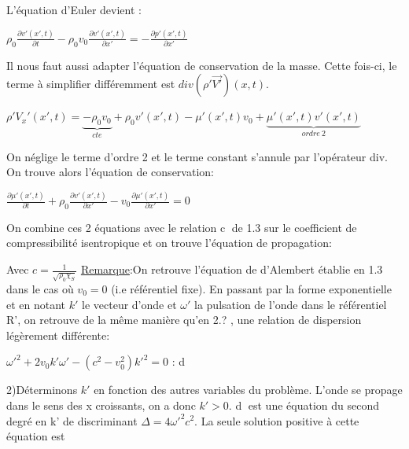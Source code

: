 \documentclass[a4paper, 12pt]{article}
\begin{document}
L'équation d'Euler devient :
\begin{center}
$\rho_0\frac{\partial v'(x',t)}{\partial t}-\rho_0v_0\frac{\partial v'(x',t)}{\partial x'}=-\frac{\partial p'(x',t)}{\partial x'}$
\end{center}
Il nous faut aussi adapter l'équation de conservation de la masse. Cette fois-ci, le terme à simplifier différemment est $div(\rho'\vec{V'})(x,t)$.
\begin{center}
$\rho'V_x'(x',t)=\underbrace{-\rho_0v_0}_{cte}+\rho_0v'(x',t)-\mu'(x',t)v_0+\underbrace{\mu'(x',t)v'(x',t)}_{ordre\:2}$
\end{center}
On néglige le terme d'ordre 2 et le terme constant s'annule par l'opérateur div. On trouve alors l'équation de conservation:
\begin{center}
$\frac{\partial \mu'(x',t)}{\partial t}+\rho_0\frac{\partial v'(x',t)}{\partial x'}-v_0\frac{\partial \mu'(x',t)}{\partial x'}=0$
\end{center}
On combine ces 2 équations avec le relation \textcircled{c} de 1.3 sur le coefficient de compressibilité isentropique et on trouve l'équation de propagation:
\begin{center}
\end{center}
Avec $c=\frac{1}{\sqrt{\rho_0\chi_S}}$\newline
\underline{Remarque}:On retrouve l'équation de d'Alembert établie en 1.3 dans le cas où $v_0=0$ (i.e référentiel fixe).\newline
En passant par la forme exponentielle et en notant $k'$ le vecteur d'onde et $\omega'$ la pulsation de l'onde dans le référentiel R', on retrouve de la même manière qu'en 2.? , une relation de dispersion légèrement différente:
\begin{center}
$\omega'^2+2v_0k'\omega'-(c^2-v_0^2)k'^2=0$    : \textcircled{d}
\end{center}
2)Déterminons $k'$ en fonction des autres variables du problème.\newline \newline
L'onde se propage dans le sens des x croissants, on a donc $k'>0$. \textcircled{d} est une équation du second degré en k' de discriminant $\Delta=4\omega'^2c^2$.\newline
La seule solution positive à cette équation est
\begin{center}
\end{center}
\end{document}
